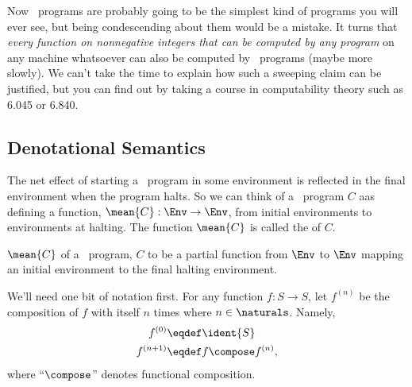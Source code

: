 Now \while\ programs are probably going to be the simplest kind of programs you will
ever see, but being condescending about them would be a mistake.  It turns
that \emph{every function on nonnegative integers that can be computed by
  any program} on any machine whatsoever can also be computed by \while\ programs
(maybe more slowly).  We can't take the time to explain how such a
sweeping claim can be justified, but you can find out by taking a course
in computability theory such as 6.045 or 6.840.

\subsection{Denotational Semantics}

The net effect of starting a \while\ program in some environment is reflected in the
final environment when the program halts.  So we can think of a \while\ program $C$
aas defining a function, $\mean{C}:\Env \to \Env$, from initial
environments to environments at halting.  The function $\mean{C}$ is
called the  of $C$.

$\mean{C}$ of a \while\ program, $C$ to be a partial function from $\Env$ to $\Env$
mapping an initial environment to the final halting environment.

We'll need one bit of notation first.  For any function $f:S \to S$, let
$f^{(n)}$ be the composition of $f$ with itself $n$ times where $n \in
\naturals$.   Namely,
\begin{align*}
f^{(0)} & \eqdef \ident{S}\\
f^{(n+1)} & \eqdef f \compose f^{(n)},
\end{align*}
where ``$\compose$'' denotes functional composition.

